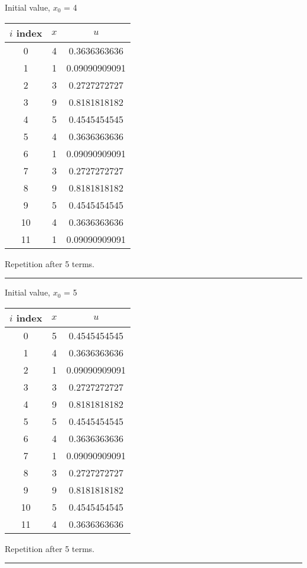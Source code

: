\documentclass{article}
\begin{document}
Initial value, $x_0$ = 4
\begin{center} \begin{tabular}{||c | c | c||}  \hline
		$i$ index & $x$ & $u$ \\ [0.5ex] \hline \hline0 & 4 & 0.3636363636\\
		\hline 
		1 & 1 & 0.09090909091\\
		\hline 
		2 & 3 & 0.2727272727\\
		\hline 
		3 & 9 & 0.8181818182\\
		\hline 
		4 & 5 & 0.4545454545\\
		\hline 
		5 & 4 & 0.3636363636\\
		\hline 
		6 & 1 & 0.09090909091\\
		\hline 
		7 & 3 & 0.2727272727\\
		\hline 
		8 & 9 & 0.8181818182\\
		\hline 
		9 & 5 & 0.4545454545\\
		\hline 
		10 & 4 & 0.3636363636\\
		\hline 
		11 & 1 & 0.09090909091\\
		\hline 
	\end{tabular} 
\end{center} Repetition after 5 terms.
\\ \noindent\rule[0.5ex]{\linewidth}{1pt}
Initial value, $x_0$ = 5
\begin{center} \begin{tabular}{||c | c | c||}  \hline
		$i$ index & $x$ & $u$ \\ [0.5ex] \hline \hline0 & 5 & 0.4545454545\\
		\hline 
		1 & 4 & 0.3636363636\\
		\hline 
		2 & 1 & 0.09090909091\\
		\hline 
		3 & 3 & 0.2727272727\\
		\hline 
		4 & 9 & 0.8181818182\\
		\hline 
		5 & 5 & 0.4545454545\\
		\hline 
		6 & 4 & 0.3636363636\\
		\hline 
		7 & 1 & 0.09090909091\\
		\hline 
		8 & 3 & 0.2727272727\\
		\hline 
		9 & 9 & 0.8181818182\\
		\hline 
		10 & 5 & 0.4545454545\\
		\hline 
		11 & 4 & 0.3636363636\\
		\hline 
	\end{tabular} 
\end{center} Repetition after 5 terms.
\\ \noindent\rule[0.5ex]{\linewidth}{1pt}
\pagebreak
\end{document}
